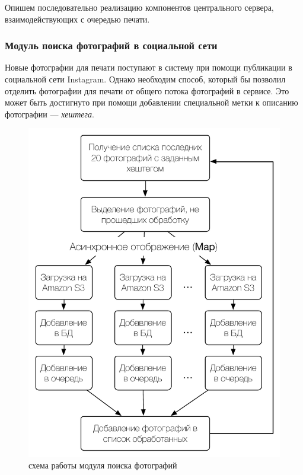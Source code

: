 \documentclass[a4paper,14pt,href,draft]{article}
\begin{document}
Опишем последовательно реализацию компонентов центрального сервера, взаимодействующих с очередью печати.

\subsubsection{Модуль поиска фотографий в социальной сети}
Новые фотографии для печати поступают в систему при помощи публикации в социальной сети Instagram. Однако необходим
способ, который бы позволил отделить фотографии для печати от общего потока фотографий в сервисе. Это может быть
достигнуто при помощи добавлении специальной метки к описанию фотографии --- \textit{хештега}.

\begin{figure}[t!]
\begin{center}
  \includegraphics[scale=0.8]{map-reduce.pdf}
    \caption{схема работы модуля поиска фотографий}
    \label{fig:MapReduce}
\end{center}
\end{figure}
\end{document}
